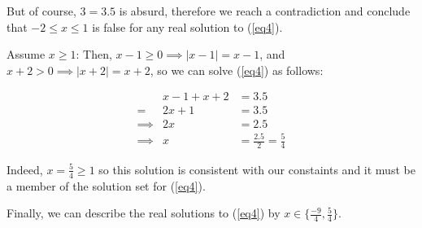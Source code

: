 \documentclass{article}
\begin{document}
But of course, $3 = 3.5$ is absurd,
therefore we reach a contradiction
and conclude that $-2 \le x \le 1$ is false for any real solution to (\ref{eq4}).

Assume $x \geq 1$:
Then, $x-1 \geq 0 \implies |x-1| = x-1$,
and $x+2 > 0 \implies |x+2| = x+2$,
so we can solve (\ref{eq4}) as follows:

\begin{align}
	& x-1 +x+2 & = 3.5 \\
	= & 2x+1 & = 3.5 \\
	\implies & 2x & = 2.5 \\
	\label{eq6} \implies & x & = \frac{2.5}{2} = \frac{5}{4}
\end{align}

Indeed, $x = \frac{5}{4} \geq 1$ so this solution is consistent
with our constaints and it must be a member of the solution set for (\ref{eq4}).

Finally, we can describe the real solutions
to (\ref{eq4}) by $x \in \{ \frac{-9}{4}, \frac{5}{4} \}$.
\end{document}
